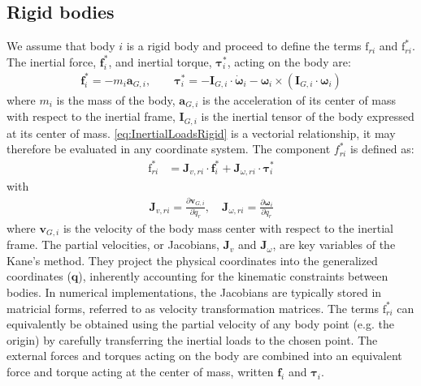\documentclass[wes, manuscript]{copernicus}
\renewcommand{\v}[1]{\boldsymbol{#1}}
\newcommand{\m}[1]{\boldsymbol{#1}}
\newcommand{\kanef}{\mathrm{f}}
\begin{document}
\subsection{Rigid bodies}
\label{sec:rigidbodies}
We assume that body $i$ is a rigid body and proceed to define the terms $\kanef_{ri}$ and $\kanef_{ri}^*$.
The inertial force, $\v{f}_i^*$, and inertial torque, $\v{\tau}_i^*$, acting on the body are:
\begin{align}
     \v{f}_i^* = - m_i \v{a}_{G,i},
         \qquad
     \v{\tau}_i^* = -\m{I}_{G,i} \cdot \v{\dot{\omega}}_i - \v{\omega} _i \times( \m{I}_{G,i}\cdot \v{\omega}_i)
      \label{eq:InertialLoadsRigid}
\end{align}
where $m_i$ is the mass of the body, $\v{a}_{G,i}$ is the acceleration of its center of mass with respect to the inertial frame, $\m{I}_{G,i}$ is the inertial tensor of the body expressed at its center of mass. 
\autoref{eq:InertialLoadsRigid} is a vectorial relationship, it may therefore be evaluated in any coordinate system. 
The component $f_{ri}^*$ is defined as:
\begin{align}
   \kanef_{ri}^* &= \v{J}_{v,ri} \cdot \v{f}_i^*  + \v{J}_{\omega,ri} \cdot \v{\tau}_i^*
    \label{eq:frstarRigid}
\end{align}
with
\begin{align}
    \v{J}_{v,ri} = \frac{\partial \v{v}_{G,i}}{\partial \dot{q}_r}
    ,\quad
    \v{J}_{\omega,ri} = \frac{\partial \v{\omega}_{i}}{\partial \dot{q}_r}
\end{align}
where $\v{v}_{G,i}$ is the velocity of the body mass center with respect to the inertial frame.
The partial velocities, or Jacobians, $\v{J}_v$ and $\v{J}_\omega$, are key variables of the Kane's method. They project the physical coordinates into the generalized coordinates ($\v{q}$), inherently accounting for the kinematic constraints between bodies. In numerical implementations, the Jacobians are typically stored in matricial forms, referred to as velocity transformation matrices.
The terms $\kanef_{ri}^*$ can equivalently be obtained using the partial velocity of any body point (e.g. the origin) by carefully transferring the inertial loads to the chosen point.
The external forces and torques acting on the body are combined into an equivalent force and torque acting at the center of mass, written $\v{f}_i$  and $\v{\tau}_i$. 
\end{document}
